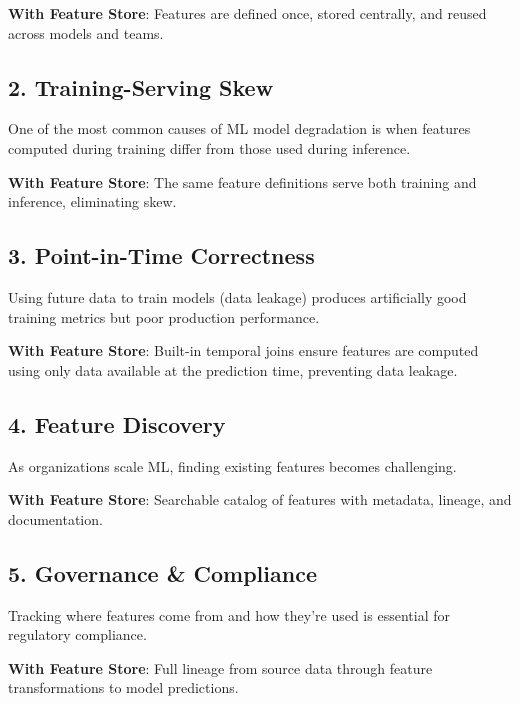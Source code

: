 \documentclass[
  letterpaper,
  DIV=11,
  numbers=noendperiod]{scrreprt}
\begin{document}
\textbf{With Feature Store}: Features are defined once, stored
centrally, and reused across models and teams.

\hypertarget{training-serving-skew}{%
\subsection{2. Training-Serving Skew}\label{training-serving-skew}}

One of the most common causes of ML model degradation is when features
computed during training differ from those used during inference.

\textbf{With Feature Store}: The same feature definitions serve both
training and inference, eliminating skew.

\hypertarget{point-in-time-correctness}{%
\subsection{3. Point-in-Time
Correctness}\label{point-in-time-correctness}}

Using future data to train models (data leakage) produces artificially
good training metrics but poor production performance.

\textbf{With Feature Store}: Built-in temporal joins ensure features are
computed using only data available at the prediction time, preventing
data leakage.

\hypertarget{feature-discovery}{%
\subsection{4. Feature Discovery}\label{feature-discovery}}

As organizations scale ML, finding existing features becomes
challenging.

\textbf{With Feature Store}: Searchable catalog of features with
metadata, lineage, and documentation.

\hypertarget{governance-compliance}{%
\subsection{5. Governance \& Compliance}\label{governance-compliance}}

Tracking where features come from and how they're used is essential for
regulatory compliance.

\textbf{With Feature Store}: Full lineage from source data through
feature transformations to model predictions.
\end{document}
